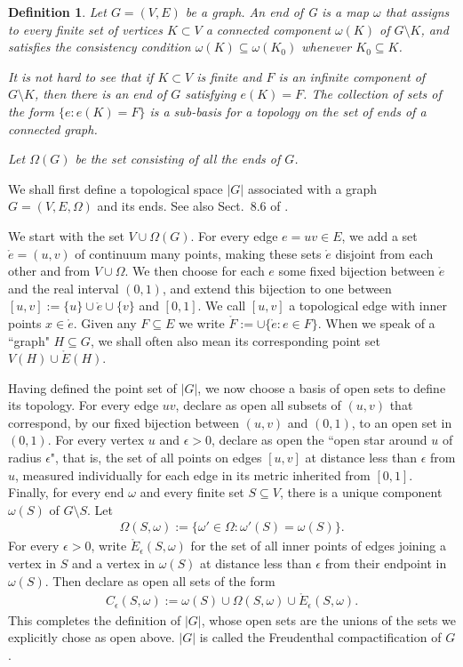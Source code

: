 \documentclass[11pt]{amsart}
\theoremstyle{plain}
\newtheorem{definition}[theorem]{Definition}
\numberwithin{equation}{section}
\numberwithin{figure}{section}
\begin{document}
\begin{definition}\label{df21}
Let $G=(V,E)$ be a graph. An end of G is a map $\omega$ that assigns to every finite set
of vertices $K\subset V$ a connected component $\omega(K)$ of $G\setminus K$, and satisfies the consistency
condition 
$\omega(K)\subseteq \omega(K_0)$ whenever $K_0\subseteq K$.

It is not hard to see that if $K \subset V$ is finite and $F$ is an infinite component of $G \setminus K$, then
there is an end of $G$ satisfying $e(K)=F$.  The collection of
sets of the form $\{e : e(K) = F\}$ is a sub-basis for a topology on the set of ends of a connected
graph. 

Let $\Omega(G)$ be the set consisting of all the ends of $G$.
\end{definition}

We shall first define a topological space $|G|$ associated with a graph $G=(V,E,\Omega)$ and its ends. See also Sect.~8.6 of \cite{Diestel2017}. 

We start with the set $V\cup \Omega(G)$. For every edge $e=uv\in E$, we add a set $\mathring{e}=(u,v)$ of continuum many points, making these sets $\mathring{e}$ disjoint from each other and from $V\cup \Omega$. We then choose for each $e$ some fixed bijection between $\mathring{e}$ and the real interval $(0,1)$, and extend this bijection to one between $[u,v]:=\{u\}\cup\mathring{e}\cup\{v\}$ and $[0,1]$. We call $[u,v]$ a topological edge with inner points $x\in \mathring{e}$. Given any $F\subseteq E$ we write $\mathring{F}:=\cup\{\mathring{e}:e\in F\}$. When we speak of a ``graph" $H\subseteq G$, we shall often also mean its corresponding point set $V(H)\cup \mathring{E}(H)$.

Having defined the point set of $|G|$, we now choose a basis of open sets to define its topology. For every edge $uv$, declare as open all subsets of $(u,v)$ that correspond, by our fixed bijection between $(u,v)$ and $(0,1)$, to an open set in $(0,1)$. For every vertex $u$ and $\epsilon>0$, declare as open the ``open star around $u$ of radius $\epsilon$", that is, the set of all points on edges $[u,v]$ at distance less than $\epsilon$ from $u$, measured individually for each edge in its metric inherited from $[0,1]$. Finally, for every end $\omega$ and every finite set $S\subseteq V$, there is a unique component $\omega(S)$ of $G\setminus S$. Let
\begin{align*}
\Omega(S,\omega):=\{\omega'\in \Omega: \omega'(S)=\omega(S)\}.
\end{align*}
For every $\epsilon>0$, write $\mathring{E}_{\epsilon}(S,\omega)$ for the set of all inner points of edges joining a vertex in $S$ and a vertex in $\omega(S)$ at distance less than $\epsilon$ from their endpoint in $\omega(S)$. Then declare as open all sets of the form
\begin{align}
C_{\epsilon}(S,\omega):=\omega(S)\cup \Omega(S,\omega)\cup \mathring{E}_{\epsilon}(S,\omega).\label{dfce}
\end{align}
This completes the definition of $|G|$, whose open sets are the unions of the sets we explicitly chose as open above.
$|G|$ is called the Freudenthal compactification of $G$.
\end{document}
